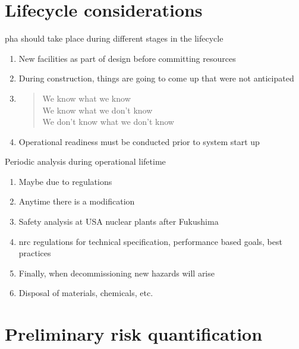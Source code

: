 \documentclass[aspectratio=1610,pdftex,dvipsnames,compress,xcolor={dvipsnames}]{beamer}
\newcommand{\acs}{\acrshort} %
\begin{document}
\section{Lifecycle considerations}


\addtocounter{framenumber}{-1}
\begin{frame}{\acs{pha} should take place during different stages in the lifecycle}
    \begin{enumerate}[series=outerlist,topsep=0pt,itemsep=21pt,leftmargin=*,label=(\arabic*)]
        \item[]New facilities as part of design before committing resources
        \item[]During construction, things are going to come up that were not anticipated
        \item[]\begin{quote}We know what we know\\We know what we don't know\\We don't know what we don't know\end{quote}
        \item[]Operational readiness must be conducted prior to system start up
    \end{enumerate}
\end{frame}


\begin{frame}{Periodic analysis during operational lifetime}
    \begin{enumerate}[series=outerlist,topsep=0pt,itemsep=15pt,leftmargin=*,label=(\arabic*)]
        \item[]Maybe due to regulations
        \item[]Anytime there is a modification  
        \item[]Safety analysis at USA nuclear plants after Fukushima
        \item[]\acs{nrc} regulations for technical specification, performance based goals, best practices
        \item[]Finally, when decommissioning new hazards will arise
        \item[]Disposal of materials, chemicals, etc.
    \end{enumerate}
\end{frame}


\section{Preliminary risk quantification}
\end{document}
